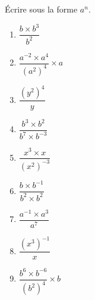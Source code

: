 \documentclass[11pt]{article}
\begin{document}
\begin{exercice}[1]
Écrire sous la forme $a^n$.
\begin{multicols}{3}
\begin{enumerate}[label=\arabic*)]
\item  $\dfrac{b\times b^{3}}{b^2}$ 
\item  $\dfrac{a^{-2}\times a^{4}}{(a^2)^{4}}\times a$ 
\item  $\dfrac{(y^2)^{4}}{y}$ 
\item  $\dfrac{b^{ 3 }\times b^2}{b^{ 7 } \times b^{ -3 }}$ 
\item  $\dfrac{x^3\times x}{(x^2)^{-3}}$ 
\item  $\dfrac{b\times b^{-1}}{b^2\times b^2}$ 
\item  $\dfrac{a^{-1}\times a^3}{a^{7}}$ 
\item  $\dfrac{(x^3)^{-1}}{x}$ 
\item  $\dfrac{b^{6}\times b^{-6}}{(b^2)^{4}}\times b$ 
\end{enumerate}
\end{multicols}
\end{exercice}
\end{document}
